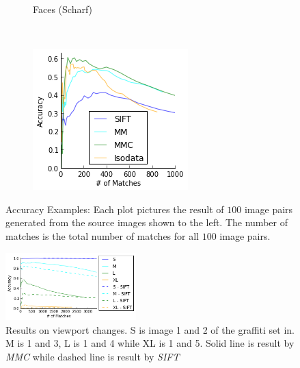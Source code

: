 \documentclass[12pt,journal,compsoc]{IEEEtran}
\begin{document}
\begin{figure}
{\begin{subfigure}[t]{.15\textwidth}
			\caption{Faces (Scharf)}
			\label{fig:result_faces}
		\end{subfigure}%
		~ %
		\begin{subfigure}[t]{.27\textwidth}
			\centering
			\includegraphics[width=\textwidth]{images/result_scharf}
		\end{subfigure}%
	}%
	\label{fig:accuracy}
	\caption{Accuracy Examples: Each plot pictures the result of $100$ 
	image pairs generated from the source images shown to the left.  The 
number of matches is the total number of matches for all $100$ image 
pairs.}
\end{figure}
%
\begin{figure}
	\centering
	\includegraphics[width=0.45\textwidth]{images/result_viewport}
	\caption{Results on viewport changes. S is image 1 and 2 of the 
	graffiti set in\cite{mikolajczyk2005performance}. M is 1 and 3, L is 
1 and 4 while XL is 1 and 5. Solid line is result by \emph{MMC} while 
dashed line is result by \emph{SIFT}}
	\label{fig:result_viewport}
\end{figure}
\end{document}
